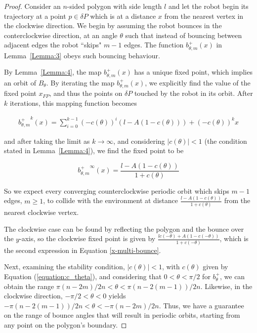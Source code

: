 \documentclass[letterpaper, 10 pt, conference]{ieeeconf}  %
\begin{document}
\begin{proof}
Consider an $n$-sided polygon with side length $l$ and let the robot begin its 
trajectory at a point $p \in \delta P$ which is at a distance $x$ from the nearest 
vertex in the clockwise direction. We begin by assuming the robot bounces 
in the conterclockwise direction, at an angle $\theta$ such that instead of 
bouncing between adjacent edges the robot ``skips" $m-1$ edges. The function
$b^+_{\theta,m}(x)$  in 
Lemma~\ref{Lemma:3} obeys such bouncing behaviour.

By Lemma~\ref{Lemma:4}, the map $b^+_{\theta,m}(x)$ has a unique fixed point,
which implies an orbit of $B_{\theta}$. By iterating the map $b^+_{\theta,m}(x)$, 
we explicitly find the value of the fixed point $x_{FP}$, and thus the points 
on $\delta P$ touched by the robot in its orbit. After $k$ iterations, this mapping 
function becomes

\begin{equation*}
\begin{aligned}
{b^+_{\theta, m}}^k(x) = \sum_{i=0}^{k-1} (-c(\theta))^i (l-A(1-c(\theta))) + (-c(\theta))^k x
\end{aligned}
\end{equation*}

\noindent and after taking the limit as $k \to \infty$, and considering
$|c(\theta)| < 1$ (the condition stated in Lemma~\ref{Lemma:4}), 
we find the fixed point to be

\begin{equation} \label{b-multi-bounce}
{b^+_{\theta, m}}^{\infty}(x) = \frac{l-A(1-c(\theta))}{1+c(\theta)}
\end{equation}

So we expect every converging counterclockwise 
periodic orbit which skips $m-1$ edges,
$m \geq 1$, to collide with the environment at distance
$\frac{l-A(1-c(\theta))}{1+c(\theta)}$ from the nearest clockwise vertex. 


The clockwise case can be found by reflecting the polygon and the bounce over the
$y$-axis, so the clockwise fixed point is given by $\frac{lc(-\theta) + A(1-c(-\theta))}{1+c(-\theta)}$, which is the second expression in Equation \ref{x-multi-bounce}.

Next, examining the stability condition,
$|c(\theta)| < 1$, with $c(\theta)$ given by Equation (\ref{equation:c_theta}),
and considering that $0 < \theta < \pi/2$ for $b^+_{\theta}$, we can obtain 
the range $\pi(n-2m)/2n < \theta < \pi(n-2(m-1))/2n$. 
Likewise, in the clockwise direction, $-\pi/2 < \theta < 0$ yields $-\pi(n-2(m-1))/2n < \theta < -\pi(n-2m)/2n$. Thus, we have a guarantee on the range of bounce angles that
will result in periodic orbits, starting from any point on the polygon's
boundary.


\end{proof}
\end{document}
